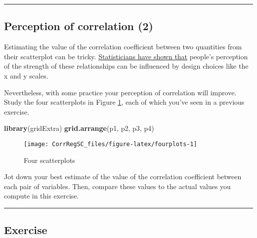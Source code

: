 \documentclass[
]{book}
\newenvironment{Shaded}{\begin{snugshade}}{\end{snugshade}}
\newcommand{\KeywordTok}[1]{\textcolor[rgb]{0.13,0.29,0.53}{\textbf{#1}}}
\newcommand{\NormalTok}[1]{#1}
\begin{document}
\begin{center}\rule{0.5\linewidth}{0.5pt}\end{center}

\hypertarget{perception-of-correlation-2}{%
\subsection*{Perception of correlation (2)}\label{perception-of-correlation-2}}

Estimating the value of the correlation coefficient between two quantities from their scatterplot can be tricky. \href{https://statistics.stanford.edu/sites/g/files/sbiybj6031/f/EFS\%20NSF\%20206.pdf}{Statisticians have shown that} people's perception of the strength of these relationships can be influenced by design choices like the x and y scales.

Nevertheless, with some practice your perception of correlation will improve. Study the four scatterplots in Figure \ref{fig:fourplots}, each of which you've seen in a previous exercise.

\begin{Shaded}
\begin{Highlighting}[]
\KeywordTok{library}\NormalTok{(gridExtra)}
\KeywordTok{grid.arrange}\NormalTok{(p1, p2, p3, p4)}
\end{Highlighting}
\end{Shaded}

\begin{figure}

{\centering \texttt{[image: CorrRegSC\_files/figure-latex/fourplots-1]} 

}

\caption{Four scatterplots}\label{fig:fourplots}
\end{figure}

Jot down your best estimate of the value of the correlation coefficient between each pair of variables. Then, compare these values to the actual values you compute in this exercise.

\begin{center}\rule{0.5\linewidth}{0.5pt}\end{center}

\hypertarget{exercise-7}{%
\subsection*{Exercise}\label{exercise-7}}
\end{document}

